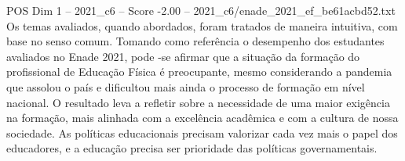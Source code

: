 \begin{textsample}{POS Dim 1 – 2021\_c6 – Score -2.00 – 2021\_c6/enade\_2021\_ef\_be61acbd52.txt}
Os temas avaliados, quando abordados, foram tratados de maneira intuitiva, com base no senso comum.
Tomando como referência o desempenho dos estudantes avaliados no Enade 2021, pode -se afirmar que a situação da formação do profissional de Educação Física é preocupante, mesmo considerando a pandemia que assolou o país e dificultou mais ainda o processo de formação em nível nacional.
O resultado leva a refletir sobre a necessidade de uma maior exigência na formação, mais alinhada com a excelência acadêmica e com a cultura de nossa sociedade.
As políticas educacionais precisam valorizar cada vez mais o papel dos educadores, e a educação precisa ser prioridade das políticas governamentais.

\end{textsample}
